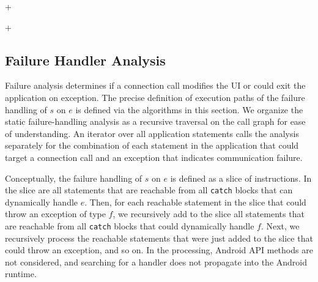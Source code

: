 \lstDeleteShortInline+

\lstMakeShortInline[basicstyle=\scriptsize\ttfamily,keywordstyle=\color{DarkPurple},breaklines=false]+



\subsection{Failure Handler Analysis}
\label{sec:failure-handling}

Failure analysis determines if a connection call modifies the UI or
could exit the application on exception.  The precise definition of
execution paths of the failure handling of $s$ on $e$ is defined via
the algorithms in this section. We organize the static
failure-handling analysis as a recursive traversal on the call graph
for ease of understanding.  An iterator over all application
statements calls the analysis separately for the combination of each
statement in the application that could target a connection call and
an exception that indicates communication failure.

Conceptually, the failure handling of $s$ on $e$ is defined as a slice
of instructions.  In the slice are all statements that are reachable
from all \lstinline!catch! blocks that can dynamically handle $e$.
Then, for each reachable statement in the slice that could throw an
exception of type $f$, we recursively add to the slice all statements
that are reachable from all \lstinline!catch! blocks that could
dynamically handle $f$.  Next, we recursively process the reachable
statements that were just added to the slice that could throw an
exception, and so on.  In the processing, Android API methods are not
considered, and searching for a handler does not propagate into the
Android runtime.

